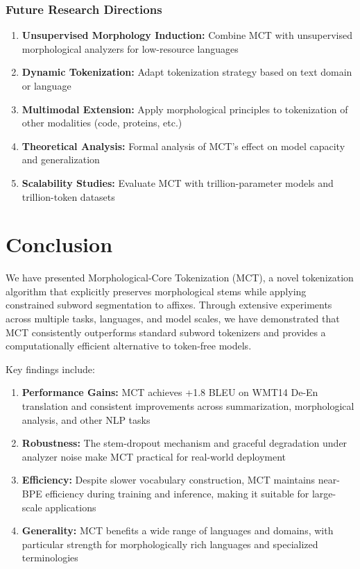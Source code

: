 \documentclass[conference]{IEEEtran}
\begin{document}
\subsubsection{Future Research Directions}
\begin{enumerate}
    \item \textbf{Unsupervised Morphology Induction:} Combine MCT with unsupervised morphological analyzers for low-resource languages
    \item \textbf{Dynamic Tokenization:} Adapt tokenization strategy based on text domain or language
    \item \textbf{Multimodal Extension:} Apply morphological principles to tokenization of other modalities (code, proteins, etc.)
    \item \textbf{Theoretical Analysis:} Formal analysis of MCT's effect on model capacity and generalization
    \item \textbf{Scalability Studies:} Evaluate MCT with trillion-parameter models and trillion-token datasets
\end{enumerate}

\section{Conclusion}
\label{sec:conclusion}

We have presented Morphological-Core Tokenization (MCT), a novel tokenization algorithm that explicitly preserves morphological stems while applying constrained subword segmentation to affixes. Through extensive experiments across multiple tasks, languages, and model scales, we have demonstrated that MCT consistently outperforms standard subword tokenizers and provides a computationally efficient alternative to token-free models.

Key findings include:
\begin{enumerate}
    \item \textbf{Performance Gains:} MCT achieves +1.8 BLEU on WMT14 De-En translation and consistent improvements across summarization, morphological analysis, and other NLP tasks
    \item \textbf{Robustness:} The stem-dropout mechanism and graceful degradation under analyzer noise make MCT practical for real-world deployment
    \item \textbf{Efficiency:} Despite slower vocabulary construction, MCT maintains near-BPE efficiency during training and inference, making it suitable for large-scale applications
    \item \textbf{Generality:} MCT benefits a wide range of languages and domains, with particular strength for morphologically rich languages and specialized terminologies
\end{enumerate}
\end{document}
